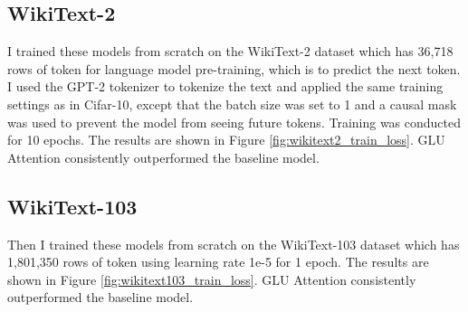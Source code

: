 \documentclass[11pt]{article}
\begin{document}
\subsection{WikiText-2}

I trained these models from scratch on the WikiText-2 dataset which has 36,718 rows of token for language model pre-training, which is to predict the next token. I used the GPT-2 tokenizer to tokenize the text and applied the same training settings as in Cifar-10, except that the batch size was set to 1 and a causal mask was used to prevent the model from seeing future tokens. Training was conducted for 10 epochs. The results are shown in Figure \ref{fig:wikitext2_train_loss}. GLU Attention consistently outperformed the baseline model.

\subsection{WikiText-103}

Then I trained these models from scratch on the WikiText-103 dataset which has 1,801,350 rows of token using learning rate 1e-5 for 1 epoch. The results are shown in Figure \ref{fig:wikitext103_train_loss}. GLU Attention consistently outperformed the baseline model.
\end{document}
